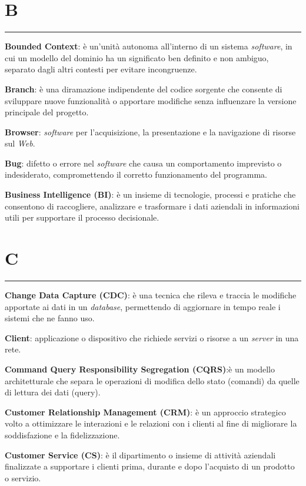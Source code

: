 \section*{B}
{\color{lightgray}\rule{\textwidth}{0.4pt}} %
\begin{glossaryitemize}
    \item \textbf{Bounded Context}: è un'unità autonoma all'interno di un sistema \textit{software}, in cui un modello del dominio ha un significato ben definito e non ambiguo, separato dagli altri contesti per evitare incongruenze.
    \item \textbf{Branch}: è una diramazione indipendente del codice sorgente che consente di sviluppare nuove funzionalità o apportare modifiche senza influenzare la versione principale del progetto.
    \item \textbf{Browser}: \textit{software} per l'acquisizione, la presentazione e la navigazione di risorse sul \textit{Web}.
    \item \textbf{Bug}: difetto o errore nel \textit{software} che causa un comportamento imprevisto o indesiderato, compromettendo il corretto funzionamento del programma.
    \item \textbf{Business Intelligence (BI)}: è un insieme di tecnologie, processi e pratiche che consentono di raccogliere, analizzare e trasformare i dati aziendali in informazioni utili per supportare il processo decisionale.
\end{glossaryitemize}

\section*{C}
{\color{lightgray}\rule{\textwidth}{0.4pt}} %
\begin{glossaryitemize}
    \item \textbf{Change Data Capture (CDC)}: è una tecnica che rileva e traccia le modifiche apportate ai dati in un \textit{database}, permettendo di aggiornare in tempo reale i sistemi che ne fanno uso.
    \item \textbf{Client}: applicazione o dispositivo che richiede servizi o risorse a un \textit{server} in una rete.
    \item \textbf{Command Query Responsibility Segregation (CQRS)}:è un modello architetturale che separa le operazioni di modifica dello stato (comandi) da quelle di lettura dei dati (query).
    \item \textbf{Customer Relationship Management (CRM)}: è un approccio strategico volto a ottimizzare le interazioni e le relazioni con i clienti al fine di migliorare la soddisfazione e la fidelizzazione.
    \item \textbf{Customer Service (CS)}: è il dipartimento o insieme di attività aziendali finalizzate a supportare i clienti prima, durante e dopo l'acquisto di un prodotto o servizio.
\end{glossaryitemize}

